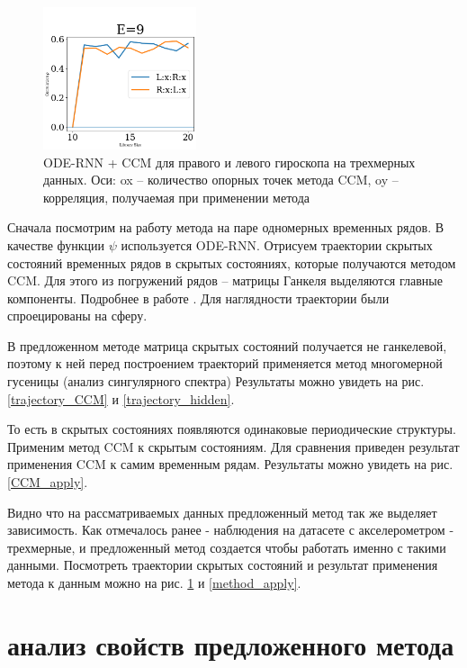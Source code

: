 \documentclass[12pt, twoside]{article}
\begin{document}
\begin{figure}
	\includegraphics[trim={0.6cm 0.8cm 0 2.7cm},clip=true,width = 0.4\textwidth]{images/method_3d.jpg}
	\caption{ODE-RNN + CCM  для правого и левого гироскопа на трехмерных данных. Оси: ox -- количество опорных точек метода CCM, oy -- корреляция, получаемая при применении метода}
	\label{method_apply_rez}
\end{figure}

	Сначала посмотрим на работу метода на паре одномерных временных рядов. В качестве функции $\psi$ используется ODE-RNN. Отрисуем траектории скрытых состояний временных рядов в скрытых состояниях, которые получаются методом CCM. Для этого из погружений рядов -- матрицы Ганкеля выделяются главные компоненты. Подробнее в работе \cite{Usmanova2018}. Для наглядности траектории были спроецированы на сферу.
	
	В предложенном методе матрица скрытых состояний получается не ганкелевой, поэтому к ней перед построением траекторий применяется метод многомерной гусеницы (анализ сингулярного спектра) \cite{SSA1997}
	Результаты можно увидеть на рис. \ref{trajectory_CCM} и \ref{trajectory_hidden}.
	
	
	То есть в скрытых состояниях появляются одинаковые периодические структуры. Применим метод CCM к скрытым состояниям. Для сравнения приведен результат применения CCM к самим временным рядам. Результаты можно увидеть на рис. \ref{CCM_apply}.



Видно что на рассматриваемых данных предложенный метод так же выделяет зависимость.
Как отмечалось ранее - наблюдения на датасете с акселерометром - трехмерные, и предложенный метод создается чтобы работать именно с такими данными. Посмотреть траектории скрытых состояний и результат применения метода к данным можно на рис. \ref{method_apply_rez} и \ref{method_apply}.


\section{анализ свойств предложенного метода}
\label{sec:theor_background}
\end{document}
